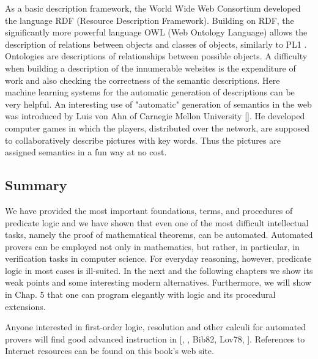 \documentclass[10pt]{book}
\begin{document}
As a basic description framework, the World Wide Web Consortium developed the language RDF (Resource Description Framework). Building on RDF, the significantly more powerful language OWL (Web Ontology Language) allows the description of relations between objects and classes of objects, similarly to PL1 \cite{set09}. Ontologies are descriptions of relationships between possible objects.
A difficulty when building a description of the innumerable websites is the expenditure of work and also checking the correctness of the semantic descriptions. Here machine learning systems for the automatic generation of descriptions can be very helpful. An interesting use of "automatic" generation of semantics in the web was introduced by Luis von Ahn of Carnegie Mellon University [\cite{va06}]. He developed computer games in which the players, distributed over the network, are supposed to collaboratively describe pictures with key words. Thus the pictures are assigned semantics in a fun way at no cost.

\subsection{Summary}
We have provided the most important foundations, terms, and procedures of predicate logic and we have shown that even one of the most difficult intellectual tasks, namely the proof of mathematical theorems, can be automated. Automated provers can be employed not only in mathematics, but rather, in particular, in verification tasks in computer science. For everyday reasoning, however, predicate logic in most cases is ill-suited. In the next and the following chapters we show its weak points and some interesting modern alternatives. Furthermore, we will show in Chap. 5 that one can program elegantly with logic and its procedural extensions.

Anyone interested in first-order logic, resolution and other calculi for automated provers will find good advanced instruction in [\cite{new00}, \cite{fit96}, Bib82, Lov78, \cite{cl73}]. References to Internet resources can be found on this book's web site.
\end{document}
